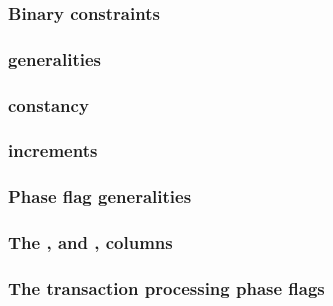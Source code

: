 \subsubsection{Binary constraints}                                                           \label{hub: system: fine structure: binarities}                      
\subsubsection{\hubStamp{} generalities}                                                     \label{hub: system: fine structure: hub stamp generalities}          
\subsubsection{\hubStamp{} constancy}                                                        \label{hub: system: fine structure: hub stamp constancy}             
\subsubsection{\hubStamp{} increments}                                                       \label{hub: system: fine structure: hub stamp increments}            
\subsubsection{Phase flag generalities}                                                      \label{hub: system: fine structure: phase flag generalities}         
\subsubsection{The \tli, \tliCounter{} and \nonStackRows, \nonStackRowsCounter{} columns}    \label{hub: system: fine structure: counters}                        
\subsubsection{The transaction processing phase flags}                                       \label{hub: system: fine structure: transaction processing flags}    
